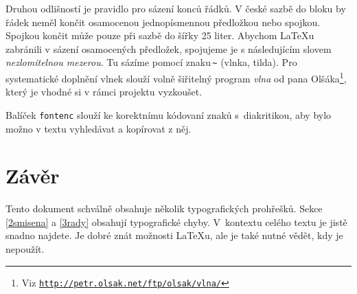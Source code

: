 \documentclass[a4paper, 10pt, twocolumn]{article}
\begin{document}
Druhou odlišností je pravidlo pro sázení konců řádků.
V české sazbě do bloku by řádek neměl končit o\-sa\-mo\-ce\-nou jednopísmennou předložkou nebo spojkou.
Spojkou  končit může pouze při sazbě do šířky 25 liter.
Abychom \LaTeX u zabránili v sázení osamocených předložek, spo\-ju\-je\-me je s následujícím slovem \textit{nezlomitelnou mezerou}.
Tu sázíme pomocí znaku\,\texttt{\textasciitilde} (vlnka, tilda).
Pro systematické do\-pl\-ně\-ní vlnek slouží volně šiřitelný program \textit{vlna} od pana Olšáka\footnote{Viz \texttt{\url{http://petr.olsak.net/ftp/olsak/vlna/}}}, který je vhodné si v rámci projektu vyzkoušet.

Balíček \texttt{fontenc} slouží ke korektnímu kódovaní znaků s~diakritikou, aby bylo možno v textu vyhledávat a ko\-pí\-ro\-vat z něj.

\section{Závěr}\label{5zaver}

Tento dokument schválně obsahuje několik typografických prohřešků.
Sekce \ref{2smisena} a \ref{3rady} obsahují typografické chyby.
V~kontextu celého textu je jistě snadno najdete.
Je dobré znát možnosti \LaTeX u, ale je také nutné vědět, kdy je nepoužít.
\end{document}
